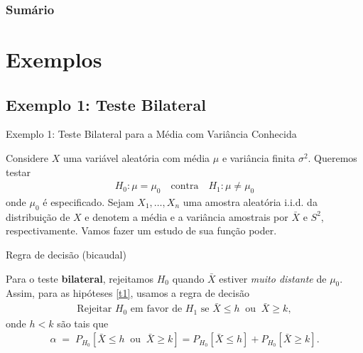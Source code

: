 \documentclass[12pt]{beamer}
\begin{document}
\begin{frame}{}
\frametitle{\bf Sumário}
\tableofcontents
\end{frame}

\section{Exemplos}
\subsection{Exemplo 1: Teste Bilateral}
\begin{frame}{Exemplo 1: Teste Bilateral para a Média com Variância Conhecida}
	\begin{block}{}
		\justifying
		Considere $X$ uma variável aleatória com média $\mu$ e variância finita $\sigma^2$. Queremos testar
		\begin{align}\label{t1}
			H_0 : \mu = \mu_0 \quad \text{contra} \quad H_1 : \mu \neq \mu_0
		\end{align}
		onde $\mu_0$ é especificado. Sejam $X_1, \ldots, X_n$ uma amostra aleatória i.i.d. da distribuição de $X$ e denotem a média e a variância amostrais por $\bar{X}$ e $S^2$, respectivamente. Vamos fazer um estudo de sua função poder.
	\end{block}
\end{frame}

\begin{frame}{Regra de decisão (bicaudal)}
	\begin{block}{}
		\justifying
		Para o teste \textbf{bilateral}, rejeitamos $H_0$ quando $\bar{X}$ estiver \emph{muito distante} de $\mu_0$. Assim, para as hipóteses \eqref{t1}, usamos a regra de decisão
		\begin{align}\label{t2}
			\text{Rejeitar } H_0 \text{ em favor de } H_1 \text{ se } \bar{X} \leq h \ \text{ ou } \ \bar{X} \geq k,
		\end{align}
		onde $h<k$ são tais que
		\begin{align}
			\alpha \;=\; P_{H_0} [\bar{X} \leq h \ \text{ ou } \ \bar{X} \geq k]
			= P_{H_0} [\bar{X} \leq h] + P_{H_0} [\bar{X} \geq k].
		\end{align}
	\end{block}
\end{frame}
\end{document}
